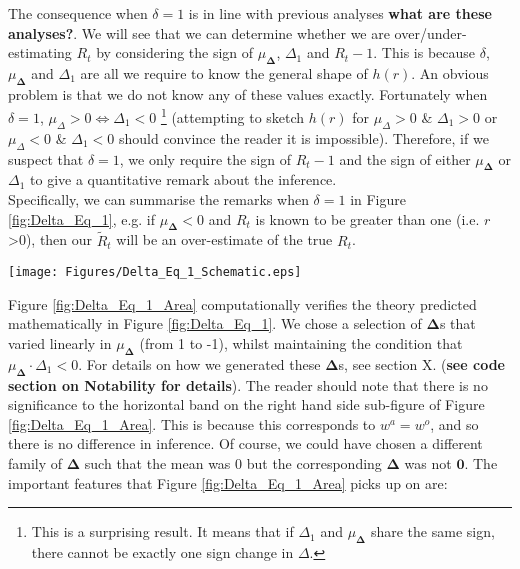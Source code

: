 \documentclass[10pt,journal,compsoc]{IEEEtran}
\begin{document}
The consequence when $\delta=1$ is in line with previous analyses \textbf{what are these analyses?}. We will see that we can determine whether we are over/under-estimating $R_t$ by considering the sign of  $\mu_{\boldsymbol{\Delta}}$, $\Delta_1$ and $R_t-1 $. This is because $\delta$, $\mu_{\boldsymbol{\Delta}}$ and $\Delta_1$ are all we require to know the general shape of $h(r)$. An obvious problem is that we do not know any of these values exactly. Fortunately when $\delta=1$, $\mu_{\Delta}>0 \iff \Delta_1 <0$ \footnote{This is a surprising result. It means that if $\Delta_1$ and $\mu_{\boldsymbol{\Delta}}$ share the same sign, there cannot be exactly one sign change in $\Delta$.} (attempting to sketch $h(r)$ for $\mu_{\Delta}>0$ \& $\Delta_1>0$ or $\mu_{\Delta}<0$ \& $\Delta_1<0$ should convince the reader it is impossible). Therefore, if we suspect that $\delta=1$, we only require the sign of $R_t-1$ and the sign of either $\mu_\boldsymbol{\Delta}$ or $\Delta_1$ to give a quantitative remark about the inference.\\

Specifically, we can summarise the remarks when $\delta=1$ in Figure \ref{fig:Delta_Eq_1}, e.g. if $\mu_{\boldsymbol{\Delta}}<0$ and $R_t$ is known to be greater than one (i.e. $r$>0), then our $\tilde{R}_t$ will be an over-estimate of the true $R_t$.

\begin{minipage}{0.95\linewidth}
\centering
\texttt{[image: Figures/Delta\_Eq\_1\_Schematic.eps]}
\label{fig:Delta_Eq_1}
\end{minipage}

Figure \ref{fig:Delta_Eq_1_Area} computationally verifies the theory predicted mathematically in Figure \ref{fig:Delta_Eq_1}. We chose a selection of $\boldsymbol{\Delta}$s that varied linearly in $\mu_{\boldsymbol{\Delta}}$ (from 1 to -1), whilst maintaining the condition that $\mu_{\boldsymbol{\Delta}}\cdot \Delta_1 <0$. For details on how we generated these $\boldsymbol{\Delta}$s, see section X. (\textbf{see code section on Notability for details}). The reader should note that there is no significance to the horizontal band on the right hand side sub-figure of Figure \ref{fig:Delta_Eq_1_Area}. This is because this corresponds to $w^a = w^o$, and so there is no difference in inference. Of course, we could have chosen a different family of $\boldsymbol{\Delta}$ such that the mean was 0 but the corresponding $\boldsymbol{\Delta}$ was not $\boldsymbol{0}$. The important features that Figure \ref{fig:Delta_Eq_1_Area} picks up on are:
\end{document}
